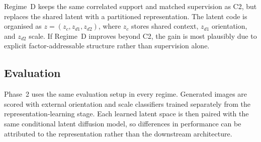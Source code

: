 Regime~D keeps the same correlated support and matched supervision as C2, but replaces the shared latent with a partitioned representation. The latent code is organised as \(z=(z_c,z_{d1},z_{d2})\), where \(z_c\) stores shared context, \(z_{d1}\) orientation, and \(z_{d2}\) scale. If Regime~D improves beyond C2, the gain is most plausibly due to explicit factor-addressable structure rather than supervision alone.

\subsection{Evaluation}
\label{subsec:p2_eval}

Phase~2 uses the same evaluation setup in every regime. Generated images are scored with external orientation and scale classifiers trained separately from the representation-learning stage. Each learned latent space is then paired with the same conditional latent diffusion model, so differences in performance can be attributed to the representation rather than the downstream architecture.





